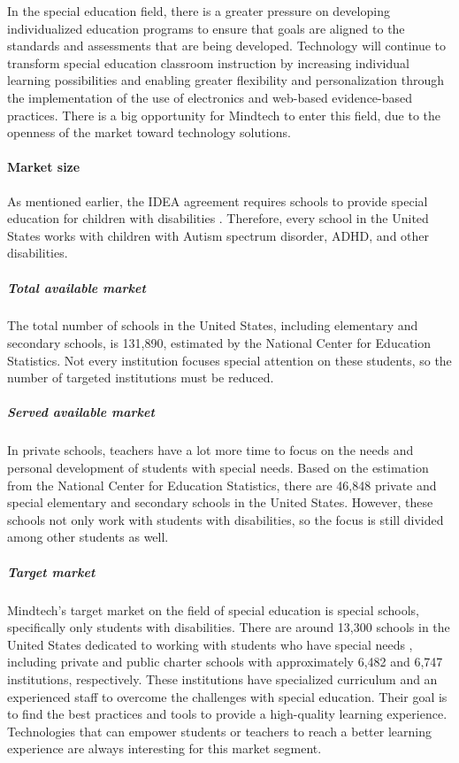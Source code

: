 \documentclass[letterpaper,10pt]{article}
\begin{document}
In the special education field, there is a greater pressure on developing individualized education programs to ensure that goals are aligned to the standards and assessments that are being developed. Technology will continue to transform special education classroom instruction by increasing individual learning possibilities and enabling greater flexibility and personalization through the implementation of the use of electronics and web-based evidence-based practices. There is a big opportunity for Mindtech to enter this field, due to the openness of the market toward technology solutions.  \cite{scientific_learning_2017}


\paragraph{Market size}

As mentioned earlier, the IDEA agreement requires schools to provide special education for children with disabilities . Therefore, every school in the United States works with children with Autism spectrum disorder, ADHD, and other disabilities. 

\subparagraph{Total available market}

The total number of schools in the United States, including elementary and secondary schools, is 131,890, estimated by the National Center for Education Statistics. Not every institution focuses special attention on these students, so the number of targeted institutions must be reduced.

\subparagraph{Served available market}

In private schools, teachers have a lot more time to focus on the needs and personal development of students with special needs. Based on the estimation from the National Center for Education Statistics, there are 46,848 private and special elementary and secondary schools in the United States. However, these schools not only work with students with disabilities, so the focus is still divided among other students as well.

\subparagraph{Target market}

Mindtech's target market on the field of special education is special schools, specifically only students with disabilities. There are around 13,300 schools in the United States dedicated to working with students who have special needs , including private and public charter schools with approximately 6,482 and 6,747 institutions, respectively. These institutions have specialized curriculum and an experienced staff to overcome the challenges with special education. Their goal is to find the best practices and tools to provide a high-quality learning experience. Technologies that can empower students or teachers to reach a better learning experience are always interesting for this market segment.
\end{document}
